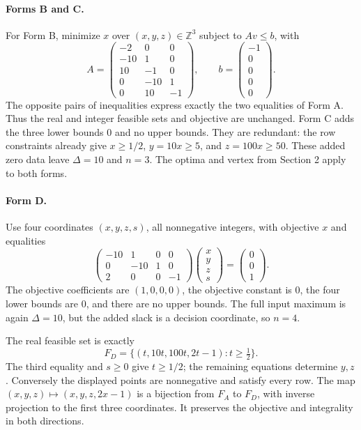 \documentclass[10pt]{article}
\begin{document}
\paragraph{Forms B and C.}
For Form B, minimize $x$ over $(x,y,z)\in\mathbb Z^3$ subject to $Av\le b$, with
\[
 A=\begin{pmatrix}
 -2&0&0\\-10&1&0\\10&-1&0\\0&-10&1\\0&10&-1
 \end{pmatrix},\qquad
 b=\begin{pmatrix}-1\\0\\0\\0\\0\end{pmatrix}.
\]
The opposite pairs of inequalities express exactly the two equalities of Form A. Thus the real and integer feasible sets and objective are unchanged. Form C adds the three lower bounds $0$ and no upper bounds. They are redundant: the row constraints already give $x\ge1/2$, $y=10x\ge5$, and $z=100x\ge50$. These added zero data leave $\Delta=10$ and $n=3$. The optima and vertex from Section 2 apply to both forms.

\paragraph{Form D.}
Use four coordinates $(x,y,z,s)$, all nonnegative integers, with objective $x$ and equalities
\[
 \begin{pmatrix}-10&1&0&0\\0&-10&1&0\\2&0&0&-1\end{pmatrix}
 \begin{pmatrix}x\\y\\z\\s\end{pmatrix}
 =\begin{pmatrix}0\\0\\1\end{pmatrix}.
\]
The objective coefficients are $(1,0,0,0)$, the objective constant is $0$, the four lower bounds are $0$, and there are no upper bounds. The full input maximum is again $\Delta=10$, but the added slack is a decision coordinate, so $n=4$.

The real feasible set is exactly
\[
 F_D=\{(t,10t,100t,2t-1):t\ge\tfrac12\}.
\]
The third equality and $s\ge0$ give $t\ge1/2$; the remaining equations determine $y,z$. Conversely the displayed points are nonnegative and satisfy every row. The map $(x,y,z)\mapsto(x,y,z,2x-1)$ is a bijection from $F_A$ to $F_D$, with inverse projection to the first three coordinates. It preserves the objective and integrality in both directions.
\end{document}
